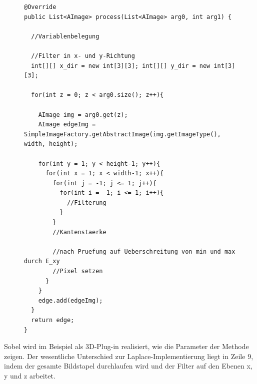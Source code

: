 \begin{figure}[htbp]
\begin{lstlisting}[frame=leftline]
@Override
public List<AImage> process(List<AImage> arg0, int arg1) {
		
  //Variablenbelegung
		
  //Filter in x- und y-Richtung
  int[][] x_dir = new int[3][3]; int[][] y_dir = new int[3][3];
  	
  for(int z = 0; z < arg0.size(); z++){

    AImage img = arg0.get(z);
    AImage edgeImg = SimpleImageFactory.getAbstractImage(img.getImageType(), width, height);

    for(int y = 1; y < height-1; y++){
      for(int x = 1; x < width-1; x++){
        for(int j = -1; j <= 1; j++){
          for(int i = -1; i <= 1; i++){
            //Filterung
          }
        }
        //Kantenstaerke
					
        //nach Pruefung auf Ueberschreitung von min und max durch E_xy
        //Pixel setzen
      }
    }
    edge.add(edgeImg);
  }
  return edge;
}
\end{lstlisting}
\end{figure}

Sobel wird im Beispiel als 3D-Plug-in realisiert, wie die Parameter der Methode zeigen. Der wesentliche Unterschied zur Laplace-Implementierung liegt in Zeile $9$, indem der gesamte Bildstapel durchlaufen wird und der Filter auf den Ebenen x, y und z arbeitet.

